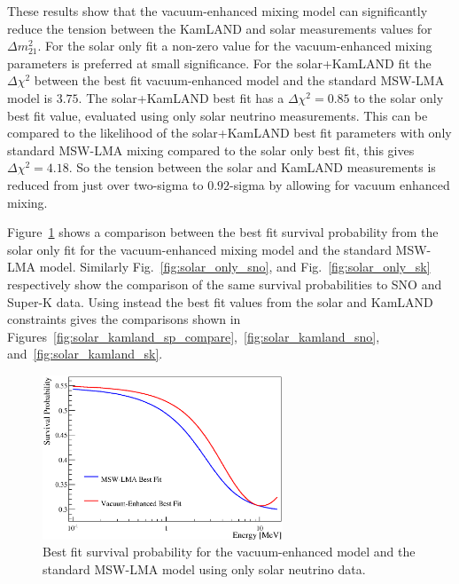 These results show that the vacuum-enhanced mixing model
can significantly reduce the tension between the KamLAND and solar measurements values
for $\Delta m^{2}_{21}$.
For the solar only fit a non-zero value for the vacuum-enhanced mixing parameters
is preferred at small significance.
For the solar+KamLAND fit the $\Delta \chi^{2}$ between the best fit vacuum-enhanced
model and the standard MSW-LMA model is $3.75$.
The solar+KamLAND best fit has a $\Delta \chi^{2} = 0.85$ to the solar only best fit value,
evaluated using only solar neutrino measurements.
This can be compared to the likelihood of the solar+KamLAND best fit parameters with
only standard MSW-LMA mixing compared to the solar only best fit, this gives $\Delta \chi^{2} = 4.18$.
So the tension between the solar and KamLAND measurements is reduced from just over two-sigma to
$0.92$-sigma by allowing for vacuum enhanced mixing.

Figure~\ref{fig:solar_only_sp_compare} shows a comparison between the best fit
survival probability from the solar only fit for the vacuum-enhanced mixing model and
the standard MSW-LMA model.
Similarly Fig.~\ref{fig:solar_only_sno}, and Fig.~\ref{fig:solar_only_sk} respectively show
the comparison of the same survival probabilities to SNO and Super-K data.
Using instead the best fit values from the solar and KamLAND constraints
gives the comparisons shown in Figures~\ref{fig:solar_kamland_sp_compare},~\ref{fig:solar_kamland_sno},
and~\ref{fig:solar_kamland_sk}.

\begin{figure}[htbp]
  \centering
  \includegraphics[width=0.64\textwidth]{sp_compare}
  \caption[Solar Only Best Fit Survival Probability  for MSW-LMA and Vacuum-Enhanced Mixing]{
  Best fit survival probability for the vacuum-enhanced model and the standard MSW-LMA model
  using only solar neutrino data.}
  \label{fig:solar_only_sp_compare}
\end{figure}

